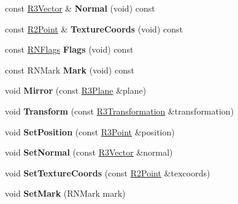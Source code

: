 \begin{DoxyCompactItemize}
\item 
const \hyperlink{class_r3_vector}{R3\+Vector} \& {\bfseries Normal} (void) const \hypertarget{class_r3_triangle_vertex_a109f30abf08a1f2e3f38f5c1b9b29d76}{}\label{class_r3_triangle_vertex_a109f30abf08a1f2e3f38f5c1b9b29d76}

\item 
const \hyperlink{class_r2_point}{R2\+Point} \& {\bfseries Texture\+Coords} (void) const \hypertarget{class_r3_triangle_vertex_a70bfd7d12f7469a1cceeceb4250c1768}{}\label{class_r3_triangle_vertex_a70bfd7d12f7469a1cceeceb4250c1768}

\item 
const \hyperlink{class_r_n_flags}{R\+N\+Flags} {\bfseries Flags} (void) const \hypertarget{class_r3_triangle_vertex_a772ca4ffaf542b9681549e8ae9afdd59}{}\label{class_r3_triangle_vertex_a772ca4ffaf542b9681549e8ae9afdd59}

\item 
const R\+N\+Mark {\bfseries Mark} (void) const \hypertarget{class_r3_triangle_vertex_ad55a78738256e7b21ebd38e8a03977c3}{}\label{class_r3_triangle_vertex_ad55a78738256e7b21ebd38e8a03977c3}

\item 
void {\bfseries Mirror} (const \hyperlink{class_r3_plane}{R3\+Plane} \&plane)\hypertarget{class_r3_triangle_vertex_a9ad67be1233ea0fcb9f15ec5bc4411ed}{}\label{class_r3_triangle_vertex_a9ad67be1233ea0fcb9f15ec5bc4411ed}

\item 
void {\bfseries Transform} (const \hyperlink{class_r3_transformation}{R3\+Transformation} \&transformation)\hypertarget{class_r3_triangle_vertex_afec897807ccd3b3b443b2f7936bddc19}{}\label{class_r3_triangle_vertex_afec897807ccd3b3b443b2f7936bddc19}

\item 
void {\bfseries Set\+Position} (const \hyperlink{class_r3_point}{R3\+Point} \&position)\hypertarget{class_r3_triangle_vertex_a3b6953c91deba95ade2892d378238a02}{}\label{class_r3_triangle_vertex_a3b6953c91deba95ade2892d378238a02}

\item 
void {\bfseries Set\+Normal} (const \hyperlink{class_r3_vector}{R3\+Vector} \&normal)\hypertarget{class_r3_triangle_vertex_ad53e2195295d700119745a8e60bb5fbb}{}\label{class_r3_triangle_vertex_ad53e2195295d700119745a8e60bb5fbb}

\item 
void {\bfseries Set\+Texture\+Coords} (const \hyperlink{class_r2_point}{R2\+Point} \&texcoords)\hypertarget{class_r3_triangle_vertex_a6ae33d85c14768cea8d45528f35c43eb}{}\label{class_r3_triangle_vertex_a6ae33d85c14768cea8d45528f35c43eb}

\item 
void {\bfseries Set\+Mark} (R\+N\+Mark mark)\hypertarget{class_r3_triangle_vertex_addc86aafe1b82a7cfd693e0bfd149b5a}{}\label{class_r3_triangle_vertex_addc86aafe1b82a7cfd693e0bfd149b5a}

\end{DoxyCompactItemize}
